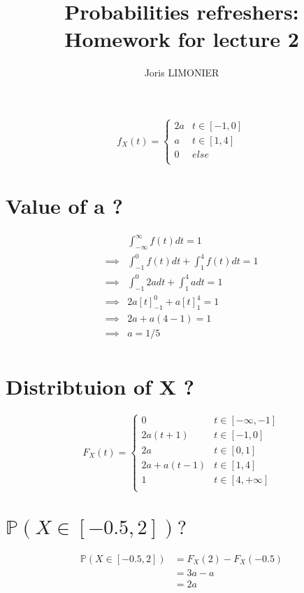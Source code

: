 \documentclass{article}
\title{Probabilities refreshers:\\Homework for lecture 2}
\author{Joris LIMONIER}
\renewcommand{\P}{\mathbb{P}}
\begin{document}
\maketitle

\[
    f_X(t) =
    \begin{cases}
        2a & t \in [-1, 0] \\
        a  & t \in [1, 4]  \\
        0  & else          \\
    \end{cases}
\]

\section{Value of a ?}

\begin{align*}
             & \int_{- \infty}^{\infty} f(t) dt = 1              \\
    \implies & \int_{- 1}^{0} f(t) dt + \int_{1}^{4} f(t) dt = 1 \\
    \implies & \int_{- 1}^{0} 2a dt + \int_{1}^{4} a dt = 1      \\
    \implies & 2a[t]_{-1}^{0} + a[t]_{1}^{4} = 1                 \\
    \implies & 2a + a(4 - 1) = 1                                 \\
    \implies & a = 1/5                                           \\
\end{align*}

\section{Distribtuion of X ?}
\[
    F_X(t) =
    \begin{cases}
        0           & t \in [-\infty, -1] \\
        2a(t+1)     & t \in [-1, 0]       \\
        2a          & t \in [0, 1]        \\
        2a + a(t-1) & t \in [1, 4]        \\
        1           & t \in [4, + \infty] \\
    \end{cases}
\]

\section{\(\P(X \in [-0.5, 2]) ?\)}
\begin{align*}
    \P(X \in [-0.5, 2])
     & = F_X (2) - F_X(-0.5) \\
     & = 3a - a              \\
     & = 2a                  \\
\end{align*}
\end{document}
